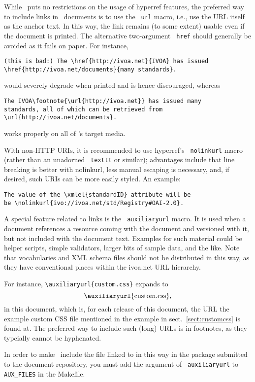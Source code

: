\documentclass[11pt,a4paper]{ivoa}
\newcommand{\texword}[1]{\texttt{\color{texcolor} #1}}
\begin{document}
While \ivoatex\ puts no restrictions on the usage of hyperref features,
the preferred way to include links in \ivoatex\ documents is to use the
\texword{url} macro, i.e., use the URL itself as the anchor text.  In
this way, the link remains (to some extent) usable even if the document
is printed.  The alternative two-argument \texword{href} should
generally be avoided as it fails on paper.  For instance,
\begin{lstlisting}
(this is bad:) The \href{http://ivoa.net}{IVOA} has issued
\href{http://ivoa.net/documents}{many standards}.
\end{lstlisting}
would severely degrade when printed and is hence discouraged, whereas
\begin{lstlisting}
The IVOA\footnote{\url{http://ivoa.net}} has issued many 
standards, all of which can be retrieved from 
\url{http://ivoa.net/documents}.
\end{lstlisting}
works properly on all of \ivoatex's target media.

With non-HTTP URIs, it is recommended to use hyperref's
\texword{nolinkurl} macro (rather than an unadorned \texword{texttt} or
similar); advantages include that line breaking is better with
nolinkurl, less manual escaping is necessary, and, if desired, 
such URIs can be more easily styled.  An example:

\begin{lstlisting}
The value of the \xmlel{standardID} attribute will be
be \nolinkurl{ivo://ivoa.net/std/Registry#OAI-2.0}.
\end{lstlisting}

A special feature related to links is the \texword{auxiliaryurl} macro.
It is used when a document references a resource coming with the
document and versioned with it, but not included with the document text.
Examples for such material could be helper scripts, simple validators,
larger bits of sample data, and the like.  Note that vocabularies and
XML schema files should not be distributed in this way, as they have
conventional places within the ivoa.net URL hierarchy.

For instance, \verb|\auxiliaryurl{custom.css}| expands to
$$\hbox{\auxiliaryurl{custom.css},}$$ in this document, 
which is, for each release of this
document, the URL the example custom CSS file mentioned in the example
in sect.~\ref{sect:customcss} is found at.  The preferred way to include
such (long) URLs is in footnotes, as they typcially cannot be hyphenated.

In order to make \ivoatex~include the file linked to in this way in the
package submitted to the document repository, you must add the argument
of \texword{auxiliaryurl} to \verb|AUX_FILES| in the Makefile.
\end{document}
